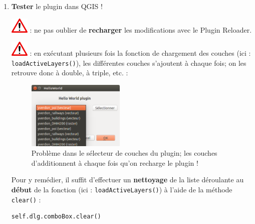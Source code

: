 \documentclass[11pt]{article}
\begin{document}
\begin{enumerate}
\item \textbf{Tester} le plugin dans QGIS !

\includegraphics[scale=1]{warningt.png} \underline{}: ne pas oublier de \textbf{recharger} les modifications avec le \og{}Plugin Reloader\fg{}. 







\newpage{}
\vspace*{-2.4em}
\includegraphics[scale=1]{warningt.png} \underline{}: en exécutant plusieurs fois la fonction de chargement des couches (ici :\\\og{}\texttt{loadActiveLayers()}\fg{}), les différentes couches s'ajoutent à chaque fois; on les retrouve donc à double, à triple, etc. :
\vspace*{-0.4em} 
\begin{figure}[H]
    \centering
    \includegraphics[width=0.44\textwidth]{layer_type_issue.png}
    \vspace*{-0.2em}
    \caption[Problème dans le sélecteur de couches]{Problème dans le sélecteur de couches du plugin; les couches d'additionnent à chaque fois qu'on recharge le plugin !}
    \label{selecterissue}
\end{figure}

Pour y remédier, il suffit d'effectuer un \textbf{nettoyage} de la liste déroulante au \textbf{début} de la fonction (ici : \og{}\texttt{loadActiveLayers()}\fg{}) à l'aide de la méthode \og{} \texttt{clear()} \fg{} :
\vspace*{-1em}
\begin{center}
\begin{minipage}[t]{0.30\textwidth}
\begin{verbatim}
self.dlg.comboBox.clear()
\end{verbatim}
\end{minipage}
\end{center}
\vspace*{0.4em}




\end{enumerate}
\end{document}
